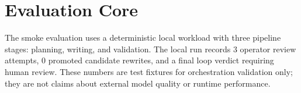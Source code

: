 \section{Evaluation Core}
The smoke evaluation uses a deterministic local workload with three pipeline stages: planning, writing, and validation. The local run records 3 operator review attempts, 0 promoted candidate rewrites, and a final loop verdict requiring human review. These numbers are test fixtures for orchestration validation only; they are not claims about external model quality or runtime performance.
